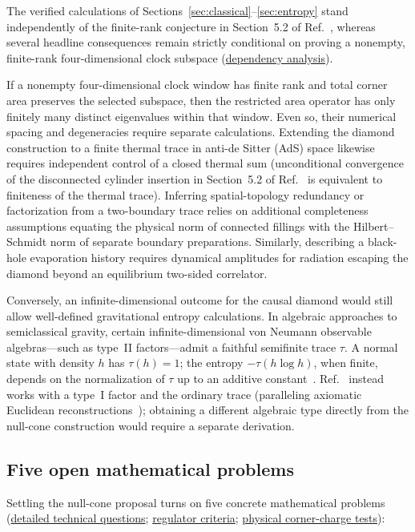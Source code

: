 \documentclass[10pt,a4paper]{article}
\numberwithin{equation}{section}
\newcommand{\repo}[2]{\href{https://github.com/sprajs/quantum-gravity/blob/main/#1}{#2}}
\begin{document}
The verified calculations of Sections~\ref{sec:classical}--\ref{sec:entropy} stand independently of the finite-rank conjecture in Section~5.2 of Ref.~\cite{Chandrasekaran2026}, whereas several headline consequences remain strictly conditional on proving a nonempty, finite-rank four-dimensional clock subspace (\repo{audit/dependencies.md}{dependency analysis}).

If a nonempty four-dimensional clock window has finite rank and total corner area preserves the selected subspace, then the restricted area operator has only finitely many distinct eigenvalues within that window.
Even so, their numerical spacing and degeneracies require separate calculations.
Extending the diamond construction to a finite thermal trace in anti-de Sitter (AdS) space likewise requires independent control of a closed thermal sum (unconditional convergence of the disconnected cylinder insertion in Section~5.2 of Ref.~\cite{Chandrasekaran2026} is equivalent to finiteness of the thermal trace).
Inferring spatial-topology redundancy or factorization from a two-boundary trace relies on additional completeness assumptions equating the physical norm of connected fillings with the Hilbert--Schmidt norm of separate boundary preparations.
Similarly, describing a black-hole evaporation history requires dynamical amplitudes for radiation escaping the diamond beyond an equilibrium two-sided correlator.

Conversely, an infinite-dimensional outcome for the causal diamond would still allow well-defined gravitational entropy calculations.
In algebraic approaches to semiclassical gravity, certain infinite-dimensional von Neumann observable algebras---such as type~II factors---admit a faithful semifinite trace $\tau$. A normal state with density $h$ has $\tau(h)=1$; the entropy $-\tau(h\log h)$, when finite, depends on the normalization of $\tau$ up to an additive constant~\cite{ChandrasekaranLongoPeningtonWitten2023,JensenSorceSperanza2023}.
Ref.~\cite{Chandrasekaran2026} instead works with a type~I factor and the ordinary trace (paralleling axiomatic Euclidean reconstructions~\cite{ColafranceschiDongMarolfWang2024}); obtaining a different algebraic type directly from the null-cone construction would require a separate derivation.

\subsection{Five open mathematical problems}

Settling the null-cone proposal turns on five concrete mathematical problems (\repo{REFEREE.md}{detailed technical questions}; \repo{audit/regulator-program.md}{regulator criteria}; \repo{audit/finite-kinematics.md}{physical corner-charge tests}):
\end{document}
